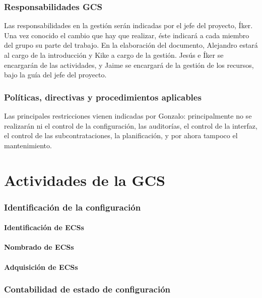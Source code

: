 \documentclass[spanish,a4paper,11pt, twoside]{report}	%
\begin{document}
	\section{Responsabilidades GCS}
	Las responsabilidades en la gestión serán indicadas por el jefe del proyecto, Íker. Una vez conocido el cambio que hay que realizar, éste indicará a cada miembro del grupo su parte del trabajo. En la elaboración del documento,
	Alejandro estará al cargo de la introducción y  Kike a cargo de la gestión. Jesús e Íker se encargarán de las actividades,  y Jaime se encargará de la gestión de los recursos, bajo la guía del jefe del proyecto.
	\section{Políticas, directivas y procedimientos aplicables}
	Las principales restricciones vienen indicadas por Gonzalo: principalmente no se realizarán ni el control de la configuración, las auditorías, el control de la interfaz, el control de las subcontrataciones, la planificación, y por ahora 
	tampoco el mantenimiento.

\newpage
\mbox{}
\thispagestyle{empty}						%
\newpage

\setcounter{section}{0}

\part{Actividades de la GCS}
	\section{Identificación de la configuración}
		\subsection{Identificación de ECSs}
		\subsection{Nombrado de ECSs}
		\subsection{Adquisición de ECSs}
	\section{Contabilidad de estado de configuración} %
\end{document}
